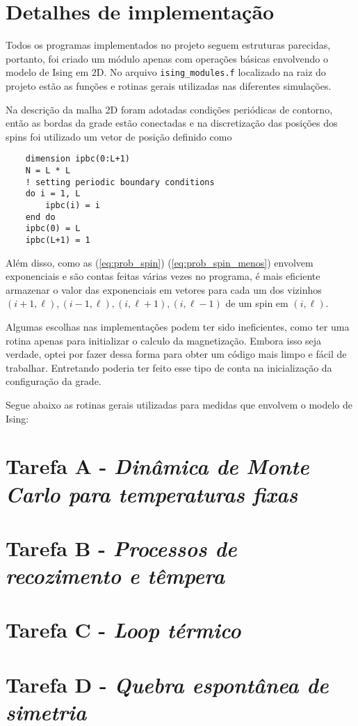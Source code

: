 \documentclass{tufte-handout}
\begin{document}
\section{Detalhes de implementação}

Todos os programas implementados no projeto seguem estruturas parecidas, portanto, foi
criado um módulo apenas com operações básicas envolvendo o modelo de Ising em $2$D. No arquivo
\verb|ising_modules.f| localizado na raiz do projeto estão as funções e rotinas gerais utilizadas
nas diferentes simulações.

Na descrição da malha 2D foram adotadas condições periódicas de contorno, então as bordas da grade 
estão conectadas e na discretização das posições dos spins foi utilizado um vetor de posição definido como 

\begin{verbatim}
    dimension ipbc(0:L+1)
    N = L * L
    ! setting periodic boundary conditions
    do i = 1, L
        ipbc(i) = i
    end do  
    ipbc(0) = L
    ipbc(L+1) = 1
\end{verbatim}

Além disso, como as (\ref{eq:prob_spin}) (\ref{eq:prob_spin_menos}) envolvem exponenciais
e são contas feitas várias vezes no programa, é mais eficiente armazenar o valor das exponenciais em vetores 
para cada um dos vizinhos $(i+1, \ell), (i-1, \ell), (i, \ell+1), (i, \ell -1)$  de um spin em $(i, \ell)$.

Algumas escolhas nas implementações podem ter sido ineficientes, como ter uma rotina apenas para initializar o calculo 
da magnetização. Embora isso seja verdade, optei por fazer dessa forma para obter um código mais 
limpo e fácil de trabalhar. Entretando poderia ter feito esse tipo de conta na inicialização da configuração 
da grade.

Segue abaixo as rotinas gerais utilizadas para medidas que envolvem o modelo de Ising:


\section{Tarefa A - \emph{Dinâmica de Monte Carlo para temperaturas fixas}}


\section{Tarefa B - \emph{Processos de recozimento e têmpera}}


\section{Tarefa C - \emph{Loop térmico}}


\section{Tarefa D - \emph{Quebra espontânea de simetria}}

\end{document}

